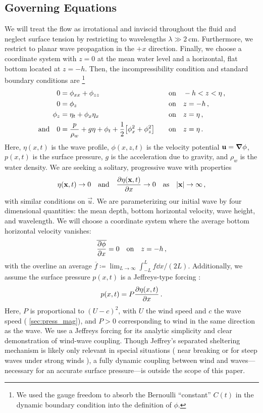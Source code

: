 \documentclass{jfm}
\begin{document}
\subsection{Governing Equations}
We will treat the flow as irrotational and inviscid throughout the
fluid and neglect surface tension by restricting to wavelengths $\lambda
\gg \SI{2}{\centi\meter}$.
Furthermore, we restrict to planar wave propagation in the $+x$
direction.
Finally, we choose a coordinate system with $z=0$ at the mean water level and
a horizontal, flat bottom located at $z=-h$.
Then, the incompressibility condition and standard boundary conditions
are%
\footnote{
  We used the gauge freedom to absorb the Bernoulli ``constant'' $C(t)$
  in the dynamic boundary condition into the definition of $\phi$.
}
\begin{alignat}{2}
  0 &= \phi_{xx} + \phi_{zz} &&\qq{on}
  -h < z < \eta \,, \label{eq:laplace}\\
  0 &= \phi_{z} &&\qq{on} z=-h \,, \label{eq:bottom_bc}\\
  \phi_{z} &= \eta_{t} + \phi_{x} \eta_{x} &&\qq{on} z = \eta \,,
  \label{eq:kinematic_bc}\\
  \qq*{and} 0 &= \frac{p}{\rho_w} + g\eta + \phi_{t} +
  \frac{1}{2} \bqty{\phi_{x}^2 + \phi_{z}^2} &&\qq{on} z=
  \eta \,. \label{eq:dynamic_bc}
\end{alignat}
Here, $\eta(x,t)$ is the wave profile, $\phi(x,z,t)$ is the velocity
potential $\mathbf{\bm{u}} = \grad{\phi}$, $p(x,t)$ is the surface pressure,
$g$ is the acceleration due to gravity, and $\rho_w$ is the water
density.
We are seeking a solitary, progressive wave with properties
\begin{gather}
  \eta(\vec{x},t) \to 0 \qq{and} \pdv{\eta(\vec{x},t)}{x} \to 0 \qq{as}
  \abs{\vec{x}} \to \infty \,,
\end{gather}
with similar conditions on $\vec{u}$.
We are parameterizing our initial wave by four dimensional quantities:
the mean depth, bottom horizontal velocity, wave height, and wavelength.
We will choose a coordinate system where the average bottom horizontal
velocity vanishes:
\begin{equation}
  \overline{ \pdv{\phi}{x} } = 0 \qq{on} z=-h \,,
  \label{eq:bot_bc_horz}
\end{equation}
with the overline an average $\overline{f} \coloneqq
\lim_{L\to\infty} \int_{-L}^{L} f \dd{x} / (2L)$.
Additionally, we assume the surface pressure $p(x,t)$ is a Jeffreys-type
forcing \citep{jeffreys1925formation}:
\begin{equation}
  p(x,t) = P \pdv{\eta(x,t)}{x} \,.
\end{equation}
Here, $P$ is proportional to $(U-c)^2$, with $U$ the wind speed and $c$
the wave speed (\cf{} \cref{sec:press_mag}), and $P>0$ corresponding to
wind in the same direction as the wave.
We use a Jeffreys forcing for its analytic simplicity and clear
demonstration of wind-wave coupling.
Though Jeffrey's separated sheltering mechanism is likely only relevant
in special situations (\eg{} near breaking
\citealp{banner1976separation} or for steep waves under strong winds
\citealp{tian2013evolution,touboul2006interaction}),
a fully dynamic coupling between wind and waves---necessary for an
accurate surface pressure---is outside the scope of this paper.
\end{document}
